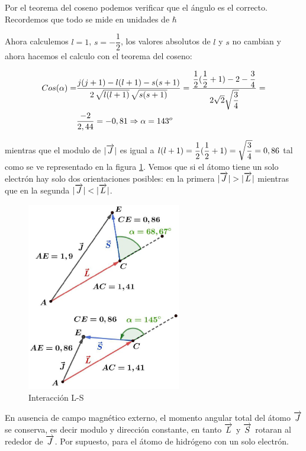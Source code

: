 Por el teorema del coseno podemos verificar que el ángulo es el correcto. Recordemos que todo se mide en unidades de $\hbar$

Ahora calculemos $l=1$, $s=-\dfrac{1}{2}$, los valores absolutos de $l$ y $s$ no cambian y ahora  hacemos el calculo con el teorema del coseno:

\begin{equation}
	\begin{aligned}[c]
	Cos(\alpha) =& \dfrac{j(j+1)-l(l+1)-s(s+1)}{2\,\sqrt{l(l+1)}\,\sqrt{s(s+1)}} = \dfrac{\dfrac{1}{2}(\dfrac{1}{2} + 1)-2-\dfrac{3}{4}}{2\sqrt{2}\sqrt{\dfrac{3}{4}}}=\\
	&\dfrac{-2}{2,44}=-0,81\Rightarrow \alpha = 143^{o}
	\end{aligned}
\end{equation}


mientras que el modulo de $\vert \overrightarrow{J} \vert$ es igual a $l(l + 1)=\dfrac{1}{2}(\dfrac{1}{2} + 1)=\sqrt{\dfrac{3}{4}}=0,86$ tal como se ve representado en la figura \ref{fig:115}. Vemos que si el átomo tiene un solo electrón hay solo dos orientaciones posibles: en la primera $\vert \overrightarrow{J} \vert>\vert \overrightarrow{L} \vert$ mientras que en la segunda $\vert \overrightarrow{J} \vert<\vert \overrightarrow{L} \vert$.


\begin{figure}[H]
    \centering
    \includegraphics[width=0.6\textwidth]{./Figures/fig115}
	\caption{Interacción L-S}
	\label{fig:115}
 \end{figure}

En ausencia de campo magnético externo, el momento angular total del átomo $\overrightarrow{J}$ se conserva, es decir modulo y dirección constante, en tanto $\overrightarrow{L}$ y $\overrightarrow{S}$ rotaran al rededor de $\overrightarrow{J}$. Por supuesto, para el átomo de hidrógeno con un solo electrón.

